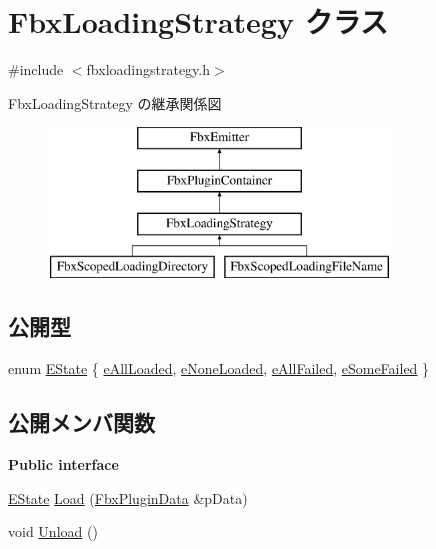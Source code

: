 \hypertarget{class_fbx_loading_strategy}{}\section{Fbx\+Loading\+Strategy クラス}
\label{class_fbx_loading_strategy}


{\ttfamily \#include $<$fbxloadingstrategy.\+h$>$}

Fbx\+Loading\+Strategy の継承関係図\begin{figure}[H]
\begin{center}
\leavevmode
\includegraphics[height=4.000000cm]{class_fbx_loading_strategy}
\end{center}
\end{figure}
\subsection*{公開型}
\begin{DoxyCompactItemize}
\item 
enum \hyperlink{class_fbx_loading_strategy_a2f61523e78f4bb06d46ccf3351d2bcdb}{E\+State} \{ \hyperlink{class_fbx_loading_strategy_a2f61523e78f4bb06d46ccf3351d2bcdbab1c0124ff0a40e7a567a96edae73b834}{e\+All\+Loaded}, 
\hyperlink{class_fbx_loading_strategy_a2f61523e78f4bb06d46ccf3351d2bcdba75e79797fc07199bda3c5f49c1825fbc}{e\+None\+Loaded}, 
\hyperlink{class_fbx_loading_strategy_a2f61523e78f4bb06d46ccf3351d2bcdba9c9b2cf75eb23ea11cc6bf91cfd04ecd}{e\+All\+Failed}, 
\hyperlink{class_fbx_loading_strategy_a2f61523e78f4bb06d46ccf3351d2bcdba18d6e8bbfd8bc1c0e9e8d8a175d4bc15}{e\+Some\+Failed}
 \}
\end{DoxyCompactItemize}
\subsection*{公開メンバ関数}
\begin{Indent}\textbf{ Public interface}\par
\begin{DoxyCompactItemize}
\item 
\hyperlink{class_fbx_loading_strategy_a2f61523e78f4bb06d46ccf3351d2bcdb}{E\+State} \hyperlink{class_fbx_loading_strategy_a3923744db719aaebabe262e2e3891d8a}{Load} (\hyperlink{struct_fbx_plugin_data}{Fbx\+Plugin\+Data} \&p\+Data)
\item 
void \hyperlink{class_fbx_loading_strategy_a53e5398383c4b2df2c8047c7d0d20581}{Unload} ()
\end{DoxyCompactItemize}
\end{Indent}
